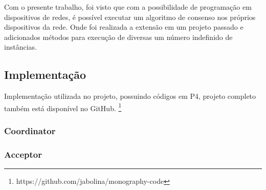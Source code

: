 \documentclass[
    12pt,
    openright, 
    oneside,
    a4paper,
    french,
    english,
    brazil
    ]{facom-ufu-abntex2}
\theoremstyle{definition}
\begin{document}
Com o presente trabalho, foi visto que com a possibilidade de programação em dispositivos de redes, é possível executar um algoritmo
de consenso nos próprios dispositivos da rede. Onde foi realizada a extensão em um projeto passado e adicionados métodos para execução
de diversas um número indefinido de instâncias. 



\begin{apendicesenv}
\partapendices
\chapter{Implementação}

Implementação utilizada no projeto, possuindo códigos em P4, projeto completo também está disponível no GitHub.
\footnote{https://github.com/jabolina/monography-code}

\subsection{Coordinator}


\subsection{Acceptor}


\end{apendicesenv}
\end{document}
